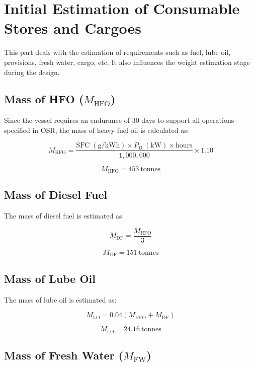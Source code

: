 \documentclass[12pt,a4paper,twoside]{report}
\begin{document}
\section{Initial Estimation of Consumable Stores and Cargoes}

This part deals with the estimation of requirements such as fuel,
lube oil, provisions, fresh water, cargo, etc. It also influences the
weight estimation stage during the design.

\subsection{Mass of HFO (\texorpdfstring{$M_{\mathrm{HFO}}$}{MHFO})}

Since the vessel requires an endurance of 30 days to support all
operations specified in OSR, the mass of heavy fuel oil is calculated
as:

\begin{equation}
M_{\mathrm{HFO}}
=
\frac{\mathrm{SFC}\;(\mathrm{g/kWh}) \times P_B\;(\mathrm{kW})
\times \mathrm{hours}}{1{,}000{,}000}
\times 1.10
\end{equation}

\[
M_{\mathrm{HFO}} = 453~\text{tonnes}
\]
\subsection{Mass of Diesel Fuel}

The mass of diesel fuel is estimated as

\begin{equation}
M_{\mathrm{DF}} = \frac{M_{\mathrm{HFO}}}{3}
\end{equation}

\[
M_{\mathrm{DF}} = 151~\text{tonnes}
\]


\subsection{Mass of Lube Oil}

The mass of lube oil is estimated as:

\begin{equation}
M_{\mathrm{LO}}
=
0.04\left(M_{\mathrm{HFO}} + M_{\mathrm{DF}}\right)
\end{equation}

\[
M_{\mathrm{LO}} = 24.16~\text{tonnes}
\]


\subsection{Mass of Fresh Water (\texorpdfstring{$M_{\mathrm{FW}}$}{MFW})}
\end{document}
